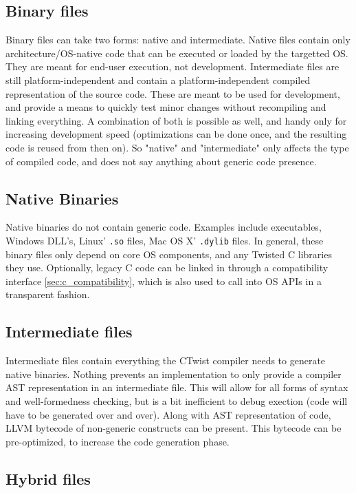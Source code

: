 \documentclass[a4paper,11pt]{article}
\newcommand{\tcode}[1]{\texttt{#1}}
\begin{document}
  \subsection{Binary files}

Binary files can take two forms: native and intermediate.
Native files contain only architecture/OS-native code that can be executed or loaded by the targetted OS.
They are meant for end-user execution, not development.
Intermediate files are still platform-independent and contain a platform-independent compiled representation of the source code.
These are meant to be used for development, and provide a means to quickly test minor changes without recompiling and linking everything.
A combination of both is possible as well, and handy only for increasing development speed (optimizations can be done once, and the resulting code is reused from then on).
So "native" and "intermediate" only affects the type of compiled code, and does not say anything about generic code presence.

  \subsection{Native Binaries}

Native binaries do not contain generic code.
Examples include executables, Windows DLL's, Linux' \tcode{.so} files, Mac OS X' \tcode{.dylib} files.
In general, these binary files only depend on core OS components, and any Twisted C libraries they use.
Optionally, legacy C code can be linked in through a compatibility interface \ref{sec:c_compatibility}, which is also used to call into OS APIs in a transparent fashion.

  \subsection{Intermediate files}

Intermediate files contain everything the CTwist compiler needs to generate native binaries.
Nothing prevents an implementation to only provide a compiler AST representation in an intermediate file.
This will allow for all forms of syntax and well-formedness checking, but is a bit inefficient to debug exection (code will have to be generated over and over).
Along with AST representation of code, LLVM bytecode of non-generic constructs can be present.
This bytecode can be pre-optimized, to increase the code generation phase. 

  \subsection{Hybrid files}
\end{document}
